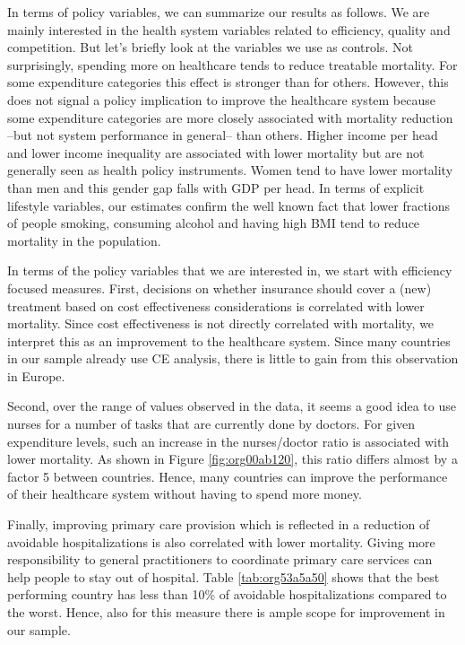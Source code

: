 \documentclass[12pt,english,a4paper]{article}
\begin{document}
In terms of policy variables, we can summarize our results as follows. We are mainly interested in the health system variables related to efficiency, quality and competition. But let's briefly look at the variables we use as controls. Not surprisingly, spending more on healthcare tends to reduce treatable mortality. For some expenditure categories this effect is stronger than for others. However, this does not signal a policy implication to improve the healthcare system because some expenditure categories are more closely associated with mortality reduction --but not system performance in general-- than others. Higher income per head and lower income inequality are associated with lower mortality but are not generally seen as health policy instruments. Women tend to have lower mortality than men and this gender gap falls with GDP per head. In terms of explicit lifestyle variables, our estimates confirm the well known fact that lower fractions of people smoking, consuming alcohol and having high BMI tend to reduce mortality in the population.

In terms of the policy variables that we are interested in, we start with efficiency focused measures. First, decisions on whether insurance should cover a (new) treatment based on cost effectiveness considerations is correlated with lower mortality. Since cost effectiveness is not directly correlated with mortality, we interpret this as an improvement to the healthcare system. Since many countries in our sample already use CE analysis, there is little to gain from this observation in Europe.

Second, over the range of values observed in the data, it seems a good idea to use nurses for a number of tasks that are currently done by doctors. For given expenditure levels, such an increase in the nurses/doctor ratio is associated with lower mortality. As shown in Figure \ref{fig:org00ab120}, this ratio differs almost by a factor 5 between countries. Hence, many countries can improve the performance of their healthcare system without having to spend more money.

Finally, improving primary care provision which is reflected in a reduction of avoidable hospitalizations is also correlated with lower mortality. Giving more responsibility to general practitioners to coordinate primary care services can help people to stay out of hospital. Table \ref{tab:org53a5a50} shows that the best performing country has less than 10\% of avoidable hospitalizations compared to the worst. Hence, also for this measure there is ample scope for improvement in our sample. 
\end{document}
